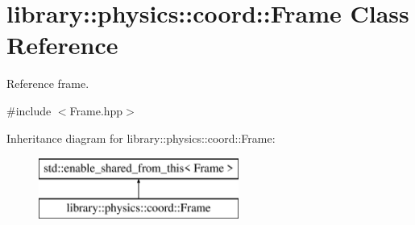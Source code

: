\hypertarget{classlibrary_1_1physics_1_1coord_1_1_frame}{}\section{library\+:\+:physics\+:\+:coord\+:\+:Frame Class Reference}
\label{classlibrary_1_1physics_1_1coord_1_1_frame}


Reference frame.  




{\ttfamily \#include $<$Frame.\+hpp$>$}

Inheritance diagram for library\+:\+:physics\+:\+:coord\+:\+:Frame\+:\begin{figure}[H]
\begin{center}
\leavevmode
\includegraphics[height=2.000000cm]{classlibrary_1_1physics_1_1coord_1_1_frame}
\end{center}
\end{figure}
